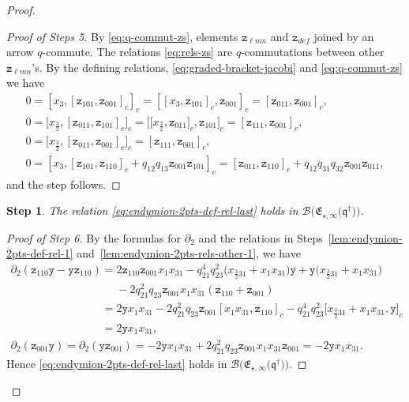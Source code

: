 \documentclass[pdftex]{sigma}
\numberwithin{equation}{section}
\newtheorem{stepi}{Step}
\newcommand{\toba}{\mathscr B}
\newcommand{\yt}{\mathtt{y}}
\newcommand{\zt}{\mathtt{z}}
\newcommand{\eny}{\mathfrak{E}}
\newcommand{\enyIIb}[1]{\eny_{\star,#1}}
\newcommand{\bq}{\mathfrak{q}}
\newcommand{\bqs}{\bq^{\dagger}}
\newcommand{\tresdos}{\frac{3}{2}}
\begin{document}
\begin{proof}
\begin{proof}[Proof of Steps 5]
By \eqref{eq:q-commut-zs}, elements $\zt_{\ell mn}$ and $\zt_{def}$ joined by an arrow $q$-commute.
The relations \eqref{eq:rels-zs} are $q$-commutations between other $\zt_{\ell mn}$'s.
By the defining relations, \eqref{eq:graded-bracket-jacobi} and \eqref{eq:q-commut-zs} we have
\begin{gather*}
0 = [x_3, [\zt_{101},\zt_{001}]_c]_c = [[x_3, \zt_{101}]_c,\zt_{001}]_c =[\zt_{011},\zt_{001}]_c,
\\
0 = \big[x_{\tresdos}, [\zt_{011},\zt_{101}]_c\big]_c = \big[\big[x_{\tresdos}, \zt_{011}\big]_c,\zt_{101}\big]_c =[\zt_{111},\zt_{001}]_c,
\\
0 = \big[x_{\tresdos}, [\zt_{011},\zt_{001}]_c\big]_c
=[\zt_{111},\zt_{001}]_c,
\\
0 = [x_3, [\zt_{101}, \zt_{110}]_c+q_{12}q_{13}\zt_{001}\zt_{101}]_c
= [\zt_{011}, \zt_{110}]_c+q_{12}q_{31}q_{32}\zt_{001}\zt_{011},
\end{gather*}
and the step follows.
\end{proof}



\begin{stepi}%
The relation \eqref{eq:endymion-2pts-def-rel-last} holds in $\toba\big(\enyIIb{\infty}\big(\bqs\big)\big)$.
\end{stepi}

\begin{proof}[Proof of Step 6]
By the formulas for $\partial_2$ and the relations in Steps~\ref{lem:endymion-2pts-def-rel-1} and~\ref{lem:endymion-2pts-rels-other-1},
we have
\begin{gather*}
\partial_2 (\zt_{110}\yt -\yt\zt_{110}) =
2\zt_{110}\zt_{001}x_1x_{31}
-q_{21}^4q_{23}^2\big(x_{\tresdos31}+x_1x_{31}\big)\yt+\yt\big(x_{\tresdos31}+x_1x_{31}\big)
\\
\phantom{\partial_2 (\zt_{110}\yt -\yt\zt_{110})=}
-2q_{21}^2q_{23}\zt_{001}x_1x_{31}(\zt_{110}+\zt_{001})
\\
\phantom{\partial_2 (\zt_{110}\yt -\yt\zt_{110})}
= 2\yt x_1x_{31}
-2q_{21}^2q_{23}\zt_{001}[x_1x_{31},\zt_{110}]_c
-q_{21}^4q_{23}^2\big[x_{\tresdos31}+x_1x_{31},\yt \big]_c
\\
\phantom{\partial_2 (\zt_{110}\yt -\yt\zt_{110})} = 2\yt x_1x_{31},
\\
\partial_2 (\zt_{001}\yt) = \partial_2 (\yt\zt_{001})
=-2\yt x_1x_{31} + 2q_{21}^2q_{23}\zt_{001}x_1x_{31}\zt_{001}=-2\yt x_1x_{31}.
\end{gather*}
Hence \eqref{eq:endymion-2pts-def-rel-last} holds in $\toba\big(\enyIIb{\infty}\big(\bqs\big)\big)$.
\end{proof}


\end{proof}
\end{document}
